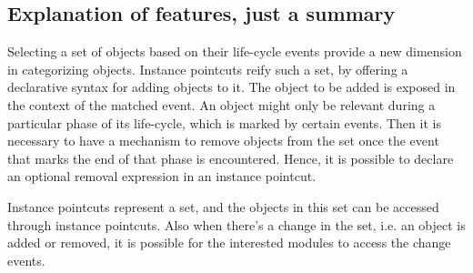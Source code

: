 \documentclass{llncs}
\begin{document}




\subsection{Explanation of features, just a summary}
Selecting a set of objects based on their life-cycle events provide a new dimension in categorizing objects. Instance pointcuts reify such a set, by offering a declarative syntax for adding objects to it. The object to be added is exposed in the context of the matched event. An object might only be relevant during a particular phase of its life-cycle, which is marked by certain events. Then it is necessary to have a mechanism to remove objects from the set once the event that marks the end of that phase is encountered. Hence, it is possible to declare an optional removal expression in an instance pointcut.

Instance pointcuts represent a set, and the objects in this set can be accessed through instance pointcuts. Also when there's a change in the set, i.e. an object is added or removed, it is  possible for the interested modules to access the change events. 
\end{document}
